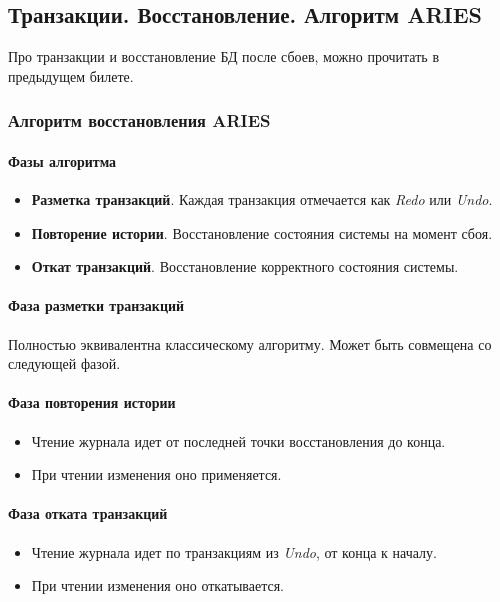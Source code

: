 \subsection{Транзакции. Восстановление. Алгоритм ARIES}

Про транзакции и восстановление БД после сбоев, можно прочитать в предыдущем билете.

\subsubsection{Алгоритм восстановления ARIES}

\paragraph{Фазы алгоритма}

\begin{itemize}
	\item \textbf{Разметка транзакций}. Каждая транзакция отмечается как
	      \textit{Redo} или \textit{Undo}.
	\item \textbf{Повторение истории}. Восстановление состояния системы на момент сбоя.
	\item \textbf{Откат транзакций}. Восстановление корректного состояния системы.
\end{itemize}

\paragraph{Фаза разметки транзакций}

Полностью эквивалентна классическому алгоритму. Может быть совмещена со следующей фазой.

\paragraph{Фаза повторения истории}

\begin{itemize}
	\item Чтение журнала идет от последней точки восстановления до конца.
	\item При чтении изменения оно применяется.
\end{itemize}

\paragraph{Фаза отката транзакций}

\begin{itemize}
	\item Чтение журнала идет по транзакциям из \textit{Undo}, от конца к началу.
	\item При чтении изменения оно откатывается.
\end{itemize}


